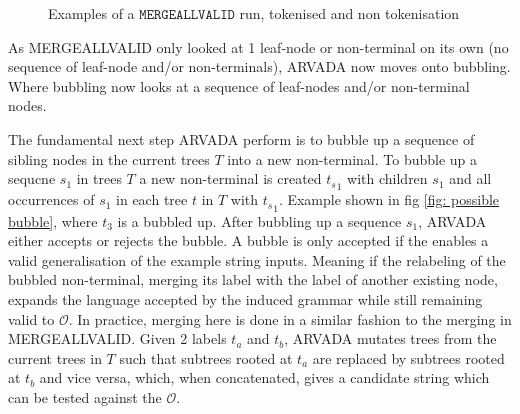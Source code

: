 \begin{figure}[H]

\caption{Examples of a $\texttt{MERGEALLVALID}$ run, tokenised and non tokenisation}
\label{fig:mergallvalid}
\end{figure}

As MERGEALLVALID only looked at 1 leaf-node or non-terminal on its own (no sequence of leaf-node and/or non-terminals), ARVADA now moves onto bubbling. Where bubbling now looks at a sequence of leaf-nodes and/or non-terminal nodes. 

\vspace{\baselineskip}
The fundamental next step ARVADA perform is to bubble up a sequence of sibling nodes in the current trees $T$ into a new non-terminal.  To bubble up a sequcne $s_1$ in trees $T$ a  new non-terminal is created ${t_s}_1$ with children $s_1$ and all occurrences of $s_1$ in each tree $t$ in $T$ with ${t_s}_1$. Example shown in fig \ref{fig: possible bubble}, where $t_3$ is a bubbled up. After bubbling up a sequence $s_1$, ARVADA either accepts or rejects the bubble. A bubble is only accepted if the enables a valid generalisation of the example string inputs. Meaning if the relabeling of the bubbled non-terminal, merging its label with the label of another existing node, expands the language accepted by the induced grammar while still remaining valid to $\mathcal{O}$. In practice, merging here is done in a similar fashion to the merging in MERGEALLVALID. Given 2 labels $t_a$ and $t_b$, ARVADA mutates trees from the current trees in $T$ such that subtrees rooted at $t_a$ are replaced by subtrees rooted at $t_b$ and vice versa, which, when concatenated, gives a candidate string which can be tested against the $\mathcal{O}$.

